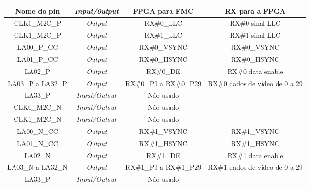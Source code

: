 \begin{enumerate}
	\begin{table}[h!]
		\centering
		\begin{tabular}{|c|c|c|c|}
			\hline
			\textbf{Nome do pin} & \textit{\textbf{Input/0utput}} & \textbf{FPGA para FMC} & \textbf{RX para a FPGA}        \\ \hline
			CLK0\_M2C\_P         & \textit{Output}                & RX\#0\_LLC             & RX\#0 sinal LLC                \\ \hline
			CLK1\_M2C\_P         & \textit{Output}                & RX\#1\_LLC             & RX\#1 sinal LLC                \\ \hline
			LA00\_P\_CC          & \textit{Output}                & RX\#0\_VSYNC           & RX\#0\_VSYNC                   \\ \hline
			LA01\_P\_CC          & \textit{Output}                & RX\#0\_HSYNC           & RX\#0\_HSYNC                   \\ \hline
			LA02\_P              & \textit{Output}                & RX\#0\_DE              & RX\#0 data enable              \\ \hline
			LA03\_P a LA32\_P    & \textit{Output}                & RX\#0\_P0 a RX\#0\_P29 & RX\#0 dados de vídeo de 0 a 29 \\ \hline
			LA33\_P              & \textit{Input/Output}          & Não usado              & ----------                     \\ \hline
			CLK0\_M2C\_N         & \textit{Input/Output}          & Não usado              & ----------                     \\ \hline
			CLK1\_M2C\_N         & \textit{Input/Output}          & Não usado              & ----------                     \\ \hline
			LA00\_N\_CC          & \textit{Output}                & RX\#1\_VSYNC           & RX\#1\_VSYNC                   \\ \hline
			LA01\_N\_CC          & \textit{Output}                & RX\#1\_HSYNC           & RX\#1\_HSYNC                   \\ \hline
			LA02\_N              & \textit{Output}                & RX\#1\_DE              & RX\#1 data enable              \\ \hline
			LA03\_N a LA32\_N    & \textit{Output}                & RX\#1\_P0 a RX\#1\_P29 & RX\#1 dados de vídeo de 0 a 29 \\ \hline
			LA33\_P              & \textit{Input/Output}          & Não usado              & ----------                     \\ \hline

\end{tabular}
\end{table}
\end{enumerate}
